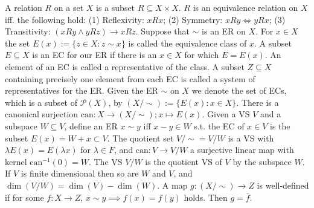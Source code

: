  A relation $R$ on a set $X$ is a subset $R \subseteq X \times X$. $R$ is an equivalence relation on $X$ iff. the following hold:
(1) Reflexivity: $xRx$;
(2) Symmetry: $xRy \Leftrightarrow yRx$;
(3) Transitivity: $(xRy \land yRz) \rightarrow xRz$.
 Suppose that $\sim$ is an ER on $X$. For $x \in X$ the set $E(x) := \{z \in X : z \sim x\}$ is called the equivalence class of $x$. A subset $E \subseteq X$ is an EC for our ER if there is an $x \in X$ for which $E = E(x)$. An element of an EC is called a representative of the class. A subset $Z \subseteq X$ containing precisely one element from each EC is called a system of representatives for the ER.
 Given the ER $\sim$ on $X$ we denote the set of ECs, which is a subset of $\mathcal{P}(X)$, by $(X/\sim) := \{E(x) : x \in X\}$. There is a canonical surjection $\mathrm{can} : X \to (X/\sim); x \mapsto E(x)$.
 Given a VS $V$ and a subspace $W \subseteq V$, define an ER $x \sim y$ iff $x - y \in W$ s.t. the EC of $x \in V$ is the subset $E(x) = W + x \subset V$. The quotient set $V/\sim = V/W$ is a VS with $\lambda E(x) = E(\lambda x)$ for $\lambda \in F$, and $\mathrm{can} : V \to V/W$ a surjective linear map with kernel $\mathrm{can}^{-1}(0) = W$. The VS $V/W$ is the quotient VS of $V$ by the subspace $W$. If $V$ is finite dimensional then so are $W$ and $V$, and $\dim(V/W) = \dim(V) - \dim(W)$.
 A map $g : (X / \sim) \to Z$ is well-defined if for some $f : X \to Z$, $x \sim y \implies f(x) = f(y)$ holds. Then $g = \bar{f}$.